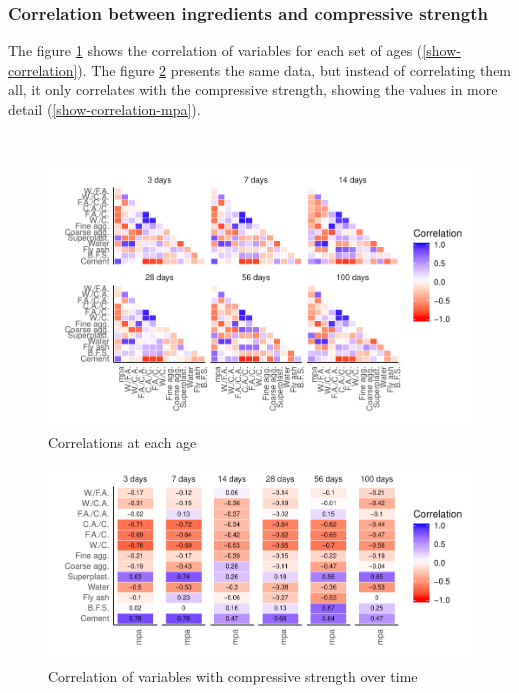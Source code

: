 \documentclass[
]{article}
\begin{document}
\hypertarget{correlation-between-ingredients-and-compressive-strength}{%
\subsubsection{Correlation between ingredients and compressive
strength}\label{correlation-between-ingredients-and-compressive-strength}}

The figure \ref{fig:correlation} shows the correlation of variables for
each set of ages (\ref{show-correlation}). The figure
\ref{fig:correlation-mpa} presents the same data, but instead of
correlating them all, it only correlates with the compressive strength,
showing the values in more detail (\ref{show-correlation-mpa}).

~

\begin{figure}

{\centering \includegraphics{paper_EN_files/figure-latex/correlation-1} 

}

\caption{Correlations at each age}\label{fig:correlation}
\end{figure}

\begin{figure}

{\centering \includegraphics{paper_EN_files/figure-latex/correlation-mpa-1} 

}

\caption{Correlation of variables with compressive strength over time}\label{fig:correlation-mpa}
\end{figure}
\end{document}
